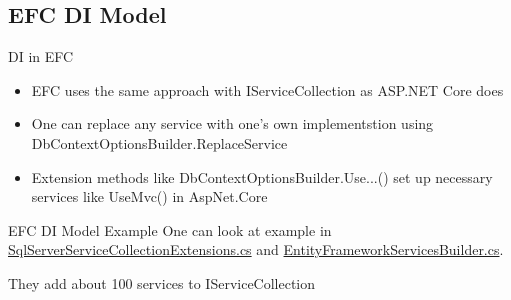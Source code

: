 \documentclass{bredelebeamer}
\begin{document}
\subsection{EFC DI Model}
\begin{frame}{DI in EFC}
    \begin{itemize}[<+->]
        \item EFC uses the same approach with IServiceCollection as ASP.NET Core does
        \item One can replace any service with one's own implementstion using DbContextOptionsBuilder.ReplaceService
        \item Extension methods like DbContextOptionsBuilder.Use...() set up necessary services like UseMvc() in AspNet.Core
    \end{itemize}
\end{frame}
\begin{frame}{EFC DI Model Example}
    One can look at example in \href{https://github.com/aspnet/EntityFrameworkCore/blob/dev/src/EFCore.SqlServer/Extensions/SqlServerServiceCollectionExtensions.cs}{SqlServerServiceCollectionExtensions.cs}
    and \href{https://github.com/aspnet/EntityFrameworkCore/blob/dev/src/EFCore/Infrastructure/EntityFrameworkServicesBuilder.cs}{EntityFrameworkServicesBuilder.cs}.

    They add about 100 services to IServiceCollection
\end{frame}
\end{document}
